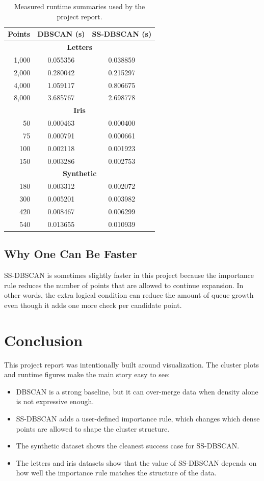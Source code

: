 \documentclass[11pt,a4paper]{article}
\begin{document}
\begin{table}[H]
\centering
\small
\begin{tabular}{rcc}
\toprule
Points & DBSCAN (s) & SS-DBSCAN (s) \\
\midrule
\multicolumn{3}{c}{\textbf{Letters}} \\
1,000 & 0.055356 & 0.038859 \\
2,000 & 0.280042 & 0.215297 \\
4,000 & 1.059117 & 0.806675 \\
8,000 & 3.685767 & 2.698778 \\
\midrule
\multicolumn{3}{c}{\textbf{Iris}} \\
50 & 0.000463 & 0.000400 \\
75 & 0.000791 & 0.000661 \\
100 & 0.002118 & 0.001923 \\
150 & 0.003286 & 0.002753 \\
\midrule
\multicolumn{3}{c}{\textbf{Synthetic}} \\
180 & 0.003312 & 0.002072 \\
300 & 0.005201 & 0.003982 \\
420 & 0.008467 & 0.006299 \\
540 & 0.013655 & 0.010939 \\
\bottomrule
\end{tabular}
\caption{Measured runtime summaries used by the project report.}
\end{table}

\subsection{Why One Can Be Faster}

SS-DBSCAN is sometimes slightly faster in this project because the importance
rule reduces the number of points that are allowed to continue expansion. In
other words, the extra logical condition can reduce the amount of queue growth
even though it adds one more check per candidate point.

\section*{Conclusion}

This project report was intentionally built around visualization. The cluster
plots and runtime figures make the main story easy to see:

\begin{itemize}
\item DBSCAN is a strong baseline, but it can over-merge data when density alone
is not expressive enough.
\item SS-DBSCAN adds a user-defined importance rule, which changes which dense
points are allowed to shape the cluster structure.
\item The synthetic dataset shows the cleanest success case for SS-DBSCAN.
\item The letters and iris datasets show that the value of SS-DBSCAN depends on
how well the importance rule matches the structure of the data.
\end{itemize}
\end{document}
